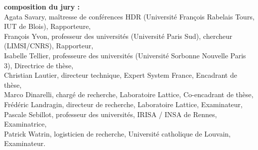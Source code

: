 \documentclass[12pt,a4paper,times,twoside,openright]{report}
\begin{document}
\begin{titlepage}
\begin{center}
\begin{footnotesize}
\begin{flushleft}
\textbf{composition du jury :}\\
{Agata Savary, maîtresse de conférences HDR (Université François Rabelais Tours, IUT de Blois), Rapporteure,}\\
{François Yvon, professeur des universités (Université Paris Sud), chercheur (LIMSI/CNRS), Rapporteur,}\\
{Isabelle Tellier, professeure des universités (Université Sorbonne Nouvelle Paris 3), Directrice de thèse,}\\
{Christian Lautier, directeur technique, Expert System France, Encadrant de thèse,}\\
{Marco Dinarelli, chargé de recherche, Laboratoire Lattice, Co-encadrant de thèse,}\\
{Frédéric Landragin, directeur de recherche, Laboratoire Lattice, Examinateur,}\\
{Pascale Sebillot, professeur des universités, IRISA / INSA de Rennes, Examinatrice,}\\
{Patrick Watrin, logisticien de recherche, Université catholique de Louvain, Examinateur.}\\
\end{flushleft}
\end{footnotesize}


\end{center}
\end{titlepage}
\end{document}
